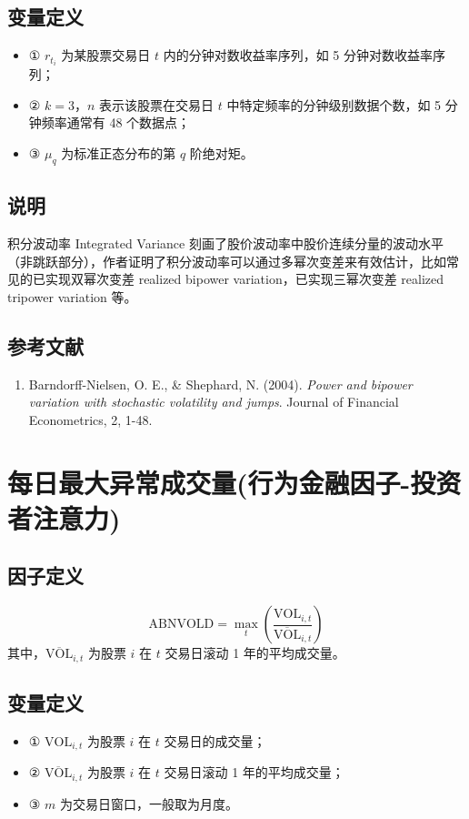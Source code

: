 \documentclass{article}
\begin{document}
\subsection{变量定义}
\begin{itemize}
    \item ① \( r_{t_i} \) 为某股票交易日 \( t \) 内的分钟对数收益率序列，如 5 分钟对数收益率序列；
    \item ② \( k=3 \)，\( n \) 表示该股票在交易日 \( t \) 中特定频率的分钟级别数据个数，如 5 分钟频率通常有 48 个数据点；
    \item ③ \( \mu_q \) 为标准正态分布的第 \( q \) 阶绝对矩。
\end{itemize}

\subsection{说明}
积分波动率 Integrated Variance 刻画了股价波动率中股价连续分量的波动水平（非跳跃部分），作者证明了积分波动率可以通过多幂次变差来有效估计，比如常见的已实现双幂次变差 realized bipower variation，已实现三幂次变差 realized tripower variation 等。

\subsection{参考文献}
\begin{enumerate}
    \item Barndorff-Nielsen, O. E., \& Shephard, N. (2004). \textit{Power and bipower variation with stochastic volatility and jumps}. Journal of Financial Econometrics, 2, 1-48.
\end{enumerate}

\section{每日最大异常成交量(行为金融因子-投资者注意力)}

\subsection{因子定义}
\begin{equation}
    \mathrm{ABNVOLD} = \max_t \left( \frac{\mathrm{VOL}_{i,t}}{\overline{\mathrm{VOL}}_{i,t}} \right)
\end{equation}
其中，\(\overline{\mathrm{VOL}}_{i,t}\) 为股票 \( i \) 在 \( t \) 交易日滚动 1 年的平均成交量。

\subsection{变量定义}
\begin{itemize}
    \item ① \( \mathrm{VOL}_{i,t} \) 为股票 \( i \) 在 \( t \) 交易日的成交量；
    \item ② \( \overline{\mathrm{VOL}}_{i,t} \) 为股票 \( i \) 在 \( t \) 交易日滚动 1 年的平均成交量；
    \item ③ \( m \) 为交易日窗口，一般取为月度。
\end{itemize}
\end{document}
